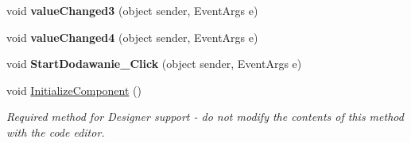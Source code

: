 \begin{DoxyCompactItemize}
void {\bfseries value\+Changed3} (object sender, Event\+Args e)
\item 
\mbox{\label{class_quiz___matematyczny_1_1_dodawanie_ad8b666185b0daefe4c8677ca7e99ec4d}} 
void {\bfseries value\+Changed4} (object sender, Event\+Args e)
\item 
\mbox{\label{class_quiz___matematyczny_1_1_dodawanie_a4c7319914f67e6bfe167ab54df75df79}} 
void {\bfseries Start\+Dodawanie\+\_\+\+Click} (object sender, Event\+Args e)
\item 
void \mbox{\hyperlink{class_quiz___matematyczny_1_1_dodawanie_ae39fb203b30ea0b007620f914f89e98c}{Initialize\+Component}} ()
\begin{DoxyCompactList}\small\item\em Required method for Designer support -\/ do not modify the contents of this method with the code editor. \end{DoxyCompactList}\end{DoxyCompactItemize}
